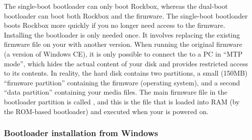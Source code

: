 
The single-boot bootloader can only boot Rockbox, whereas the dual-boot
bootloader can boot both Rockbox and the \playerman{} firmware.
The single-boot bootloader boots Rockbox more quickly if you no longer need
access to the \playerman{} firmware.\\

Installing the bootloader is only needed once. It involves replacing the
existing firmware file on your \dap{} with another version.
When running the original \playerman{} firmware (a version of Windows CE), it is
only possible to connect the \dap{} to a PC in ``MTP mode'', which hides
the actual content of your \daps{} disk and provides restricted access
to its contents.
In reality, the \daps{} hard disk contains two partitions, a small
(150MB) ``firmware partition'' containing the \daps{} firmware (operating
system), and a second ``data partition'' containing your media files. The main
firmware file in the bootloader partition is called , and
this is the file that is loaded into RAM (by the \daps{} ROM-based
bootloader) and executed when your \dap{} is powered on.

\subsubsection{Bootloader installation from Windows}


